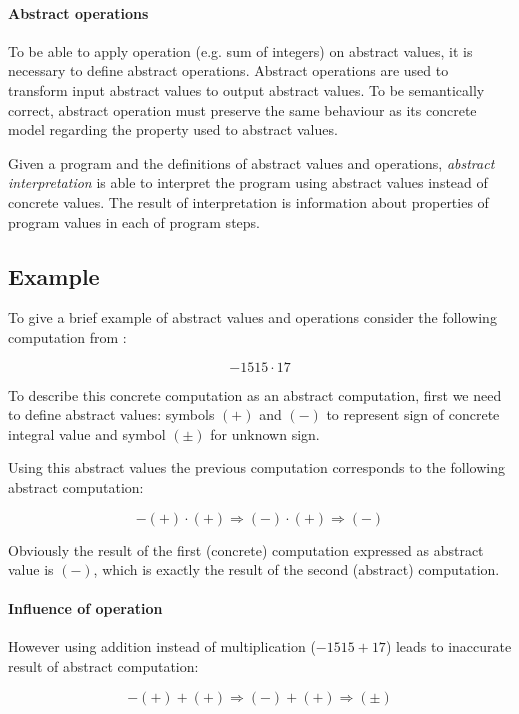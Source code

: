 \documentclass[12pt,oneside]{fithesis2}
\theoremstyle{definition}
\begin{document}
\paragraph{Abstract operations}
To be able to apply operation (e.g. sum of integers) on abstract values, it is necessary to define abstract operations. Abstract operations are used to transform input abstract values to output abstract values. To be semantically correct, abstract operation must preserve the same behaviour as its concrete model regarding the property used to abstract values.

\vspace{1\baselineskip} %

Given a program and the definitions of abstract values and operations, \textit{abstract interpretation} is able to interpret the program using abstract values instead of concrete values. The result of interpretation is information about properties of program values in each of program steps.


\subsection{Example}\label{sec:example}

To give a brief example of abstract values and operations consider the following computation from \cite{CousotCousot77-1}:

\[ -1515 \cdot 17 \]

To describe this concrete computation as an abstract computation, first we need to define abstract values: symbols $(+)$ and $(-)$ to represent sign of concrete integral value and symbol $(\pm)$ for unknown sign.

Using this abstract values the previous computation corresponds to the following abstract computation:

\[ -(+) \cdot (+) \Rightarrow (-) \cdot (+) \Rightarrow (-) \]

Obviously the result of the first (concrete) computation expressed as abstract value is $(-)$, which is exactly the result of the second (abstract) computation.

\paragraph{Influence of operation}
However using addition instead of multiplication ($-1515 + 17$) leads to inaccurate result of abstract computation:

\[ -(+) + (+) \Rightarrow (-) + (+) \Rightarrow (\pm) \]
\end{document}
